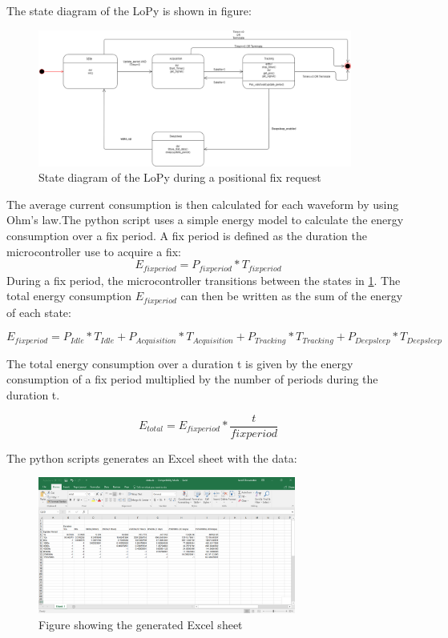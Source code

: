  
 The state diagram of the LoPy is shown in figure:
\begin{figure}[H]
\centering
\includegraphics[height=4.5cm]{Project_Report/Images/Energymodel.png}
\caption{State diagram of the LoPy during a positional fix request}
\label{fig:LoPystate}
\end{figure}


 
 
The average current consumption is then calculated for each waveform by using Ohm's law.The python script uses a simple energy model to calculate the energy consumption over a fix period. A fix period is defined as the duration the microcontroller use to acquire a fix:
\begin{equation}
E_{fixperiod} = P_{fixperiod}*T_{fixperiod}
\end{equation}
During a fix period, the microcontroller transitions between the states in \ref{fig:LoPystate}. The total energy consumption $E_{fixperiod}$ can then be written as the sum of the energy of each state:

\begin{equation}
E_{fixperiod} = P_{Idle}*T_{Idle} + P_{Acquisition}*T_{Acquisition} + P_{Tracking}*T_{Tracking} + P_{Deepsleep}*T_{Deepsleep}
\end{equation}

The total energy consumption over a duration t is given by the energy consumption of a fix period multiplied by the number of periods during the duration t.

\begin{equation}
 E_{total} = E_{fixperiod}* \frac{t}{fixperiod}
\end{equation}

The python scripts generates an Excel sheet with the data:

\begin{figure}[H]
\centering
\includegraphics[height=4.5cm]{Project_Report/Images/Excel_sample.PNG}
\caption{Figure showing the generated Excel sheet}
\label{fig:Excelsample}
\end{figure}


